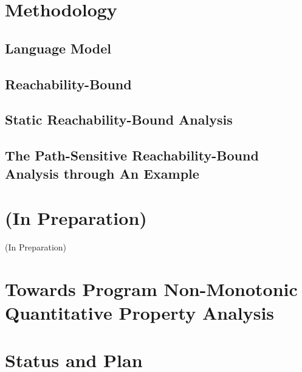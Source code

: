 \documentclass[a4paper,11pt]{article}
\begin{document}
\section{Methodology}
\label{sec:reachability-analysis}

\subsection{{Language Model}}
\label{sec:reachability-language}

\subsection{{Reachability-Bound}}
\label{sec:reachability-exe}

\subsection{{Static Reachability-Bound Analysis}}
\label{sec:reachability-static}


\subsection{The Path-Sensitive Reachability-Bound Analysis through An Example}
\label{sec:reachability-example}


\section*{(In Preparation)}
{\protect\numberline{}(In Preparation)}%

\section{Towards Program Non-Monotonic Quantitative Property Analysis}
\label{sec:generalization}


% 

\section{Status and Plan}
\label{sec:status-plan}




\end{document}
